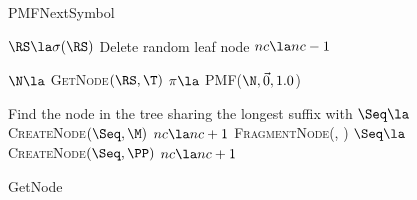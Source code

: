 \begin{figure*}[ttt!]
	\begin{minipage}[t]{.48\linewidth}
		\begin{algorithm}[H]
			\caption{PMFNextSymbol} \label{alg:pmfnextsymbol}
	\begin{algorithmic}[1]
			\State $\RS \la \sigma(\RS)$
		\EndWhile
			\State Delete random leaf node
			\State $nc \la nc -1$
		\EndWhile
		
		\State $\N \la$ \textsc{GetNode}$(\RS, \T)$
		\State $\pi \la$ \textsc{PMF}($\N, \vec 0, 1.0$) 
		\State \Return [$\pi$, \N]
	\EndFunction
	 \end{algorithmic}
\end{algorithm}
	 \end{minipage}
	\hfill
%
%
%		
%		
%	
	\begin{minipage}[t]{.48\linewidth}
\begin{algorithm}[H]
	\caption{GetNode} \label{alg:getnode}
	\begin{algorithmic}[1]
		\State Find the node \M \space in the tree sharing the longest suffix with \Seq
				\State \Return \M
			\Else
				\State $\Seq \la$ \textsc{CreateNode}$(\Seq, \M)$
				\State $nc \la nc + 1$
				\State \Return \Seq
			\EndIf
		\Else
			\State \PP \la \space \textsc{FragmentNode}(\M, \Seq)
			\State $\Seq \la $ \textsc{CreateNode}$(\Seq, \PP)$
			\State $nc \la nc + 1$
			\State \Return \Seq
		\EndIf
	\EndFunction
	\end{algorithmic}	
\end{algorithm}
	\end{minipage}
	\end{figure*}
	

